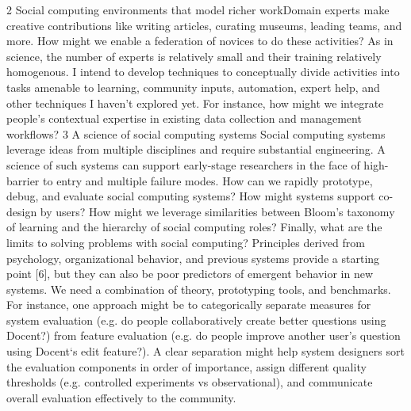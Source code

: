 2 Social computing environments that model richer workDomain experts make creative contributions like writing articles, curating museums, leading teams, and more. How might we enable a federation of novices to do these activities? As in science, the number of experts is relatively small and their training relatively homogenous. I intend to develop techniques to conceptually divide activities into tasks amenable to learning, community inputs, automation, expert help, and other techniques I haven’t explored yet. For instance, how might we integrate people’s contextual expertise in existing data collection and management workflows? 3 A science of social computing systems Social computing systems leverage ideas from multiple disciplines and require substantial engineering. A science of such systems can support early-stage researchers in the face of high-barrier to entry and multiple failure modes. How can we rapidly prototype, debug, and evaluate social computing systems? How might systems support co-design by users? How might we leverage similarities between Bloom’s taxonomy of learning and the hierarchy of social computing roles? Finally, what are the limits to solving problems with social computing? Principles derived from psychology, organizational behavior, and previous systems provide a starting point [6], but they can also be poor predictors of emergent behavior in new systems. We need a combination of theory, prototyping tools, and benchmarks. For instance, one approach might be to categorically separate measures for system evaluation (e.g. do people collaboratively create better questions using Docent?) from feature evaluation (e.g. do people improve another user’s question using Docent‘s edit feature?). A clear separation might help system designers sort the evaluation components in order of importance, assign different quality thresholds (e.g. controlled experiments vs observational), and communicate overall evaluation effectively to the community.

